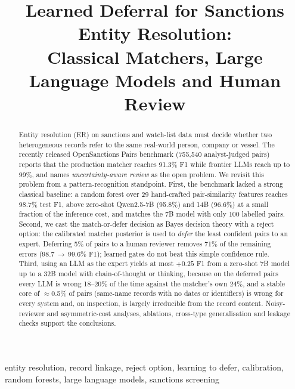 \documentclass[conference]{IEEEtran}
\begin{document}
\title{Learned Deferral for Sanctions Entity Resolution:\\ Classical Matchers, Large Language Models and Human Review}

\author{
}

\maketitle

\begin{abstract}
Entity resolution (ER) on sanctions and watch-list data must decide whether two heterogeneous records refer to the same real-world person, company or vessel. The recently released OpenSanctions Pairs benchmark (755{,}540 analyst-judged pairs) reports that the production matcher reaches 91.3\% F1 while frontier LLMs reach up to 99\%, and names \emph{uncertainty-aware review} as the open problem. We revisit this problem from a pattern-recognition standpoint. First, the benchmark lacked a strong classical baseline: a random forest over 29 hand-crafted pair-similarity features reaches 98.7\% test F1, above zero-shot Qwen2.5-7B (95.8\%) and 14B (96.6\%) at a small fraction of the inference cost, and matches the 7B model with only 100 labelled pairs. Second, we cast the match-or-defer decision as Bayes decision theory with a reject option: the calibrated matcher posterior is used to \emph{defer} the least confident pairs to an expert. Deferring 5\% of pairs to a human reviewer removes 71\% of the remaining errors (98.7\,$\rightarrow$\,99.6\% F1); learned gates do not beat this simple confidence rule. Third, using an LLM as the expert yields at most $+0.25$ F1 from a zero-shot 7B model up to a 32B model with chain-of-thought or thinking, because on the deferred pairs every LLM is wrong 18--20\% of the time against the matcher's own 24\%, and a stable core of $\approx$0.5\% of pairs (same-name records with no dates or identifiers) is wrong for every system and, on inspection, is largely irreducible from the record content. Noisy-reviewer and asymmetric-cost analyses, ablations, cross-type generalisation and leakage checks support the conclusions.
\end{abstract}

\begin{IEEEkeywords}
entity resolution, record linkage, reject option, learning to defer, calibration, random forests, large language models, sanctions screening
\end{IEEEkeywords}
\end{document}

